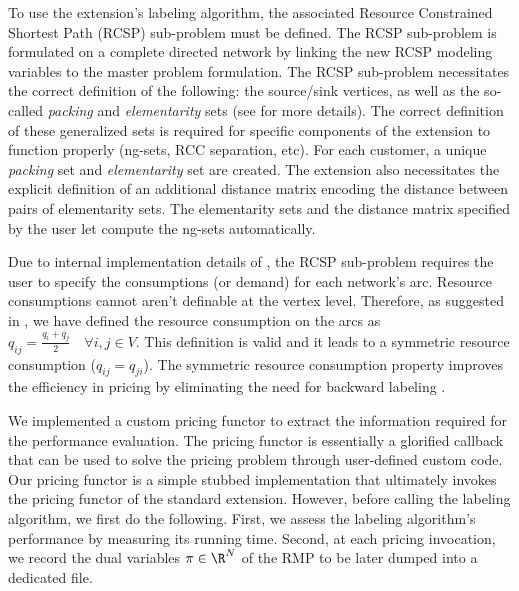 To use the \vrpsolver{} extension's labeling algorithm,
the associated Resource Constrained Shortest Path (RCSP) sub-problem must be defined.
The RCSP sub-problem is formulated on a complete directed network by
linking the new RCSP modeling variables to the master problem formulation.
The RCSP sub-problem necessitates the correct definition of the following:
the source/sink vertices, as well as the so-called \textit{packing} and \textit{elementarity} sets
(see \cite{pessoa2020generic} for more details).
The correct definition of these generalized sets is required
for specific components  of the \vrpsolver{} extension to function properly (ng-sets, RCC separation, etc).
For each customer, a unique \textit{packing} set and \textit{elementarity} set are created.
The \vrpsolver{} extension also necessitates the explicit definition of an additional
distance matrix encoding the distance between pairs of elementarity sets.
The elementarity sets and the distance matrix specified by the user
let \bapcod{} compute the ng-sets automatically.

Due to internal implementation details of \bapcod{},
the RCSP sub-problem requires the user to specify the consumptions (or demand) for each network's arc.
Resource consumptions cannot aren't definable at the vertex level.
Therefore, as suggested in \textcite{pessoa2020generic}, we have defined the resource consumption
on the arcs as $q_{ij} = \frac{q_{i} + q_{j}}{2} \quad \forall i, j \in V$.
This definition is valid and it leads to a symmetric resource consumption ($q_{ij} = q_{ji}$).
The symmetric resource consumption property improves the efficiency in pricing
by eliminating the need for backward labeling \parencite{pessoa2020generic}.

We implemented a custom pricing functor to extract the information
required for the performance evaluation.
The pricing functor is essentially a glorified callback
that can be used to solve the pricing problem through user-defined custom code.
Our pricing functor is a simple stubbed implementation
that ultimately invokes the pricing functor of the standard \vrpsolver{} extension.
However, before calling the labeling algorithm, we first do the following.
First, we assess the labeling algorithm's performance by measuring its running time.
Second, at each pricing invocation, we record the dual variables $\pi \in \R^N$ of the RMP
to be later dumped into a dedicated file.

